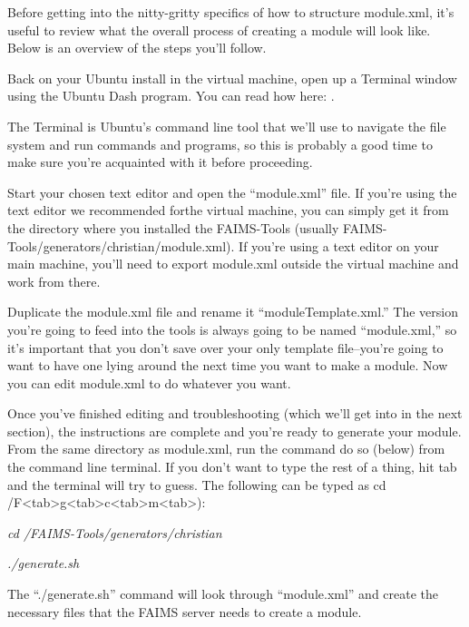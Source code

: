 
Before getting into the nitty-gritty specifics of how to structure module.xml, it's useful to review what the overall process of creating a module will look like. Below is an overview of the steps you'll follow.

Back on your Ubuntu install in the virtual machine, open up a Terminal window using the Ubuntu Dash program. You can read how here: \from[url20].

The Terminal is Ubuntu's command line tool that we'll use to navigate the file system and run commands and programs, so this is probably a good time to make sure you're acquainted with it before proceeding.

{}

Start your chosen text editor and open the “module.xml” file. If you're using the text editor we recommended forthe virtual machine, you can simply get it from the directory where you installed the FAIMS-Tools (usually FAIMS-Tools/generators/christian/module.xml). If you're using a text editor on your main machine, you'll need to export module.xml outside the virtual machine and work from there.

Duplicate the module.xml file and rename it “moduleTemplate.xml.” The version you're going to feed into the tools is always going to be named “module.xml,” so it's important that you don't save over your only template file--you're going to want to have one lying around the next time you want to make a module. Now you can edit module.xml to do whatever you want.

Once you've finished editing and troubleshooting (which we'll get into in the next section), the instructions are complete and you're ready to generate your module. From the same directory as module.xml, run the command do so (below) from the command line terminal. If you don't want to type the rest of a thing, hit tab and the terminal will try to guess. The following can be typed as cd /F<tab>g<tab>c<tab>m<tab>):

{\em cd /FAIMS-Tools/generators/christian}

{\em ./generate.sh}

The “./generate.sh” command will look through “module.xml” and create the necessary files that the FAIMS server needs to create a module.

